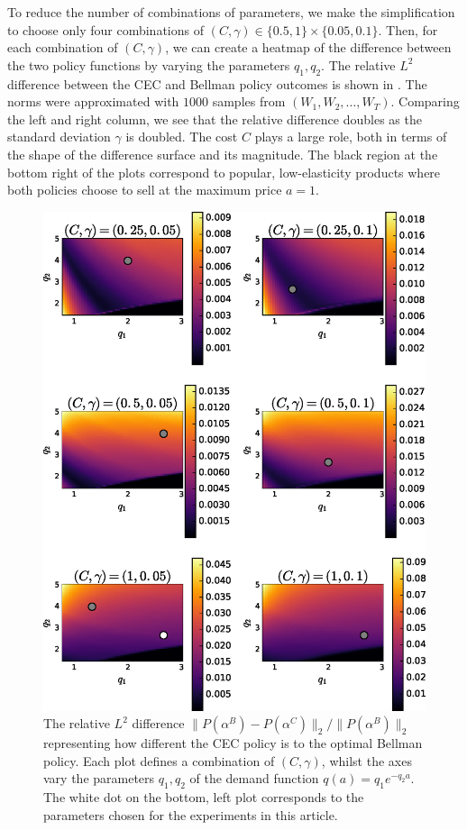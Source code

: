\documentclass[main.tex]{subfiles}
\begin{document}
To reduce the number of combinations of parameters, we make the
simplification to choose only
four combinations of
$(C,\gamma)\in\{0.5,1\}\times\{0.05,0.1\}$.
Then,
for each combination of $(C,\gamma)$,
we can create a heatmap of the difference between the two policy
functions by varying the parameters $q_1,q_2$.
The relative $L^2$ difference between the CEC and Bellman policy outcomes
is shown in . The norms were approximated
with $1000$ samples from $(W_1,W_2,\dots,W_T)$.
Comparing the left and right column, we see that the relative difference doubles as
the standard deviation $\gamma$ is doubled. The cost $C$ plays a large
role, both in terms of the shape of the difference surface and its
magnitude.
The black region at the bottom right of the plots correspond to popular,
low-elasticity products where both policies choose to sell at the
maximum price $a=1$.
\begin{figure}[htbp]
  \includegraphics[width=\textwidth]{./img/profit_diff_heatmaps}
  \caption{The relative $L^2$ difference
    $\|P(\alpha^B)-P(\alpha^C)\|_2/\|P(\alpha^B)\|_2$ representing
    how different the CEC policy is to the optimal Bellman policy.
    Each plot defines a combination of $(C,\gamma)$, whilst
    the axes vary the parameters $q_1,q_2$ of the demand function
    $q(a)=q_1e^{-q_2a}$.
    The white dot on the bottom, left plot corresponds to the
    parameters chosen for the experiments in this article.
  }\label{fig:profit_diff_heatmaps}
\end{figure}
\end{document}
